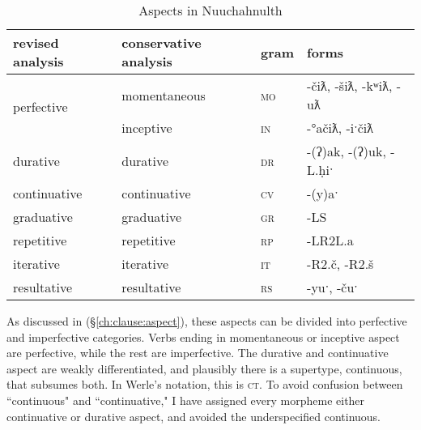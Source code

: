 \begin{table}[ht]
\centering
\caption{Aspects in Nuuchahnulth}
\label{table:aspects}
\begin{tabular}{llll}
revised analysis & conservative analysis & gram                    & forms                                                         \\ \hline
\multicolumn{1}{|l|}{\multirow{2}{*}{perfective}}   & \multicolumn{1}{l|}{momentaneous} & \multicolumn{1}{l|}{\textsc{mo}} & \multicolumn{1}{l|}{-čiƛ, -šiƛ, -kʷiƛ, -uƛ}                 \\ \cline{2-4} 
\multicolumn{1}{|l|}{}                            & \multicolumn{1}{l|}{inceptive}    & \multicolumn{1}{l|}{\textsc{in}} & \multicolumn{1}{l|}{-°ačiƛ, -iˑčiƛ}                         \\ \hline
\multicolumn{1}{|l|}{durative}                    & \multicolumn{1}{l|}{durative}     & \multicolumn{1}{l|}{\textsc{dr}} & \multicolumn{1}{l|}{-(ʔ)ak, -(ʔ)uk, -L.ḥiˑ}  \\ \hline
\multicolumn{1}{|l|}{continuative}                & \multicolumn{1}{l|}{continuative} & \multicolumn{1}{l|}{\textsc{cv}} & \multicolumn{1}{l|}{-(y)aˑ}                   \\ \hline
\multicolumn{1}{|l|}{graduative}                     & \multicolumn{1}{l|}{graduative}   & \multicolumn{1}{l|}{\textsc{gr}} & \multicolumn{1}{l|}{-LS}                        \\ \hline
\multicolumn{1}{|l|}{repetitive}                  & \multicolumn{1}{l|}{repetitive}   & \multicolumn{1}{l|}{\textsc{rp}} & \multicolumn{1}{l|}{-LR2L.a}                   \\ \hline
\multicolumn{1}{|l|}{iterative}                  & \multicolumn{1}{l|}{iterative}    & \multicolumn{1}{l|}{\textsc{it}} & \multicolumn{1}{l|}{-R2.č, -R2.š} \\ \hline \hline
\multicolumn{1}{|l|}{resultative}                 & \multicolumn{1}{l|}{resultative}  & \multicolumn{1}{l|}{\textsc{rs}} & \multicolumn{1}{l|}{-yuˑ, -čuˑ}              \\ \hline
\end{tabular}
\end{table}

As discussed in (\S\ref{ch:clause:aspect}), these aspects can be divided into perfective and imperfective categories. Verbs ending in momentaneous or inceptive aspect are perfective, while the rest are imperfective. The durative and continuative aspect are weakly differentiated, and plausibly there is a supertype, continuous, that subsumes both. In Werle's notation, this is \textsc{ct}. To avoid confusion between ``continuous" and ``continuative," I have assigned every morpheme either continuative or durative aspect, and avoided the underspecified continuous.


